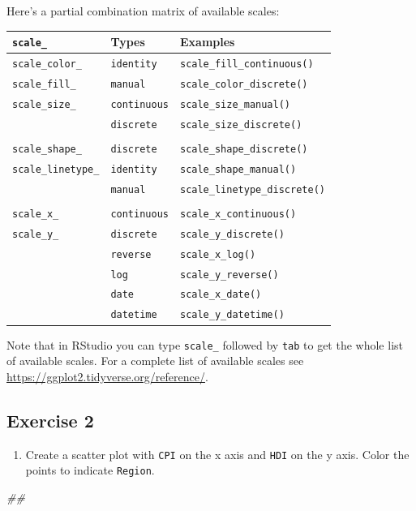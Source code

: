 \documentclass[
]{book}
\newenvironment{Shaded}{\begin{snugshade}}{\end{snugshade}}
\newcommand{\CommentTok}[1]{\textcolor[rgb]{0.56,0.35,0.01}{\textit{#1}}}
\providecommand{\tightlist}{%
  \setlength{\itemsep}{0pt}\setlength{\parskip}{0pt}}
\begin{document}
Here's a partial combination matrix of available scales:

\begin{longtable}[]{@{}lll@{}}
\toprule
\texttt{scale\_} & Types & Examples\tabularnewline
\midrule
\endhead
\texttt{scale\_color\_} & \texttt{identity} & \texttt{scale\_fill\_continuous()}\tabularnewline
\texttt{scale\_fill\_} & \texttt{manual} & \texttt{scale\_color\_discrete()}\tabularnewline
\texttt{scale\_size\_} & \texttt{continuous} & \texttt{scale\_size\_manual()}\tabularnewline
& \texttt{discrete} & \texttt{scale\_size\_discrete()}\tabularnewline
& &\tabularnewline
\texttt{scale\_shape\_} & \texttt{discrete} & \texttt{scale\_shape\_discrete()}\tabularnewline
\texttt{scale\_linetype\_} & \texttt{identity} & \texttt{scale\_shape\_manual()}\tabularnewline
& \texttt{manual} & \texttt{scale\_linetype\_discrete()}\tabularnewline
& &\tabularnewline
\texttt{scale\_x\_} & \texttt{continuous} & \texttt{scale\_x\_continuous()}\tabularnewline
\texttt{scale\_y\_} & \texttt{discrete} & \texttt{scale\_y\_discrete()}\tabularnewline
& \texttt{reverse} & \texttt{scale\_x\_log()}\tabularnewline
& \texttt{log} & \texttt{scale\_y\_reverse()}\tabularnewline
& \texttt{date} & \texttt{scale\_x\_date()}\tabularnewline
& \texttt{datetime} & \texttt{scale\_y\_datetime()}\tabularnewline
\bottomrule
\end{longtable}

Note that in RStudio you can type \texttt{scale\_} followed by \texttt{tab} to get the whole list of available scales. For a complete list of available scales see \url{https://ggplot2.tidyverse.org/reference/}.

\hypertarget{exercise-2-1}{%
\subsection{Exercise 2}\label{exercise-2-1}}

\begin{enumerate}
\def\labelenumi{\arabic{enumi}.}
\tightlist
\item
  Create a scatter plot with \texttt{CPI} on the x axis and \texttt{HDI} on the y axis. Color the points to indicate \texttt{Region}.
\end{enumerate}

\begin{Shaded}
\begin{Highlighting}[]
\CommentTok{\#\# }
\end{Highlighting}
\end{Shaded}
\end{document}
